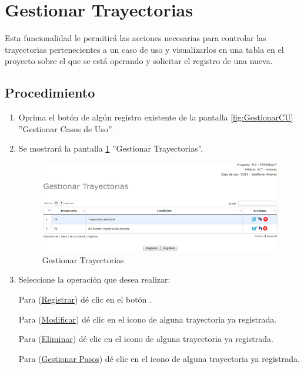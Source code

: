 \hypertarget{cv:GestionarTray}{\section{Gestionar Trayectorias}} \label{sec:GestionarTray}

	Esta funcionalidad le permitirá las acciones necesarias para controlar las trayectorias pertenecientes a un caso de uso y visualizarlos en una tabla en el proyecto sobre el que se está operando y solicitar el registro de una nueva.

		\subsection{Procedimiento}

			\begin{enumerate}
			
			\item Oprima el botón \IUTray{} de algún registro existente de la pantalla \ref{fig:GestionarCU} ''Gestionar Casos de Uso''.
	
			\item Se mostrará la pantalla \ref{fig:GestionarTrayectorias} ''Gestionar Trayectorias''.

			\begin{figure}[htbp!]
				\begin{center}
					\includegraphics[scale=0.6]{roles/lider/casosUso/trayectorias/pantallas/IU6-1-1gestionarTray}
					\caption{Gestionar Trayectorias}
					\label{fig:GestionarTrayectorias}
				\end{center}
			\end{figure}
		
				\item Seleccione la operación que desea realizar:
			
			Para (\hyperlink{cv:registrarTray}{Registrar}) dé clic en el botón \IURegistrar.
			
			Para (\hyperlink{cv:modificarTray}{Modificar}) dé clic en el icono \IUEditar{} de alguna trayectoria ya registrada.
			
			Para (\hyperlink{cv:eliminarTray}{Eliminar}) dé clic en el icono \IUBotonEliminar{} de alguna trayectoria ya registrada.
			
			Para (\hyperlink{cv:GestionarPasos}{Gestionar Pasos}) dé clic en el icono \IUPasos de alguna trayectoria ya registrada.
			
			\end{enumerate}